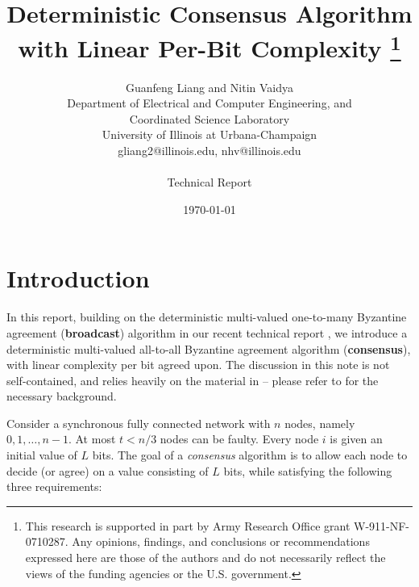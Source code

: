 \documentclass[12pt]{article}
\begin{document}
\title{Deterministic Consensus Algorithm\\ with Linear Per-Bit Complexity  \footnote{\normalsize This research is supported
in part by Army Research Office grant
W-911-NF-0710287. Any opinions, findings, and conclusions or recommendations expressed here are those of the authors and do not
necessarily reflect the views of the funding agencies or the U.S. government.}}


\date{\today}
\author{Guanfeng Liang and Nitin Vaidya\\ \normalsize Department of Electrical and Computer Engineering, and\\ \normalsize Coordinated Science Laboratory\\ \normalsize University of Illinois at Urbana-Champaign\\ \normalsize gliang2@illinois.edu, nhv@illinois.edu\\~\\Technical Report}







\maketitle


\thispagestyle{empty}

\newpage

\setcounter{page}{1}

\section{Introduction}
In this report, building on the deterministic multi-valued one-to-many Byzantine agreement ({\bf broadcast}) algorithm in our recent technical report
 \cite{techreport_BA_complexity}, we introduce a deterministic multi-valued all-to-all Byzantine agreement algorithm ({\bf consensus}), with linear complexity per bit agreed upon. The discussion in this note is not self-contained, and relies heavily on the material in \cite{techreport_BA_complexity} -- please refer to
\cite{techreport_BA_complexity} for the necessary background.

Consider a synchronous fully connected network with $n$ nodes, namely $0,1,\dots, n-1$. At most $t<n/3$ nodes can be faulty. Every node $i$ is given an initial value of $L$ bits. The goal of a {\em consensus} algorithm is to allow each node to decide (or agree) on a value consisting of $L$ bits,
 while satisfying the following three requirements:
\end{document}
